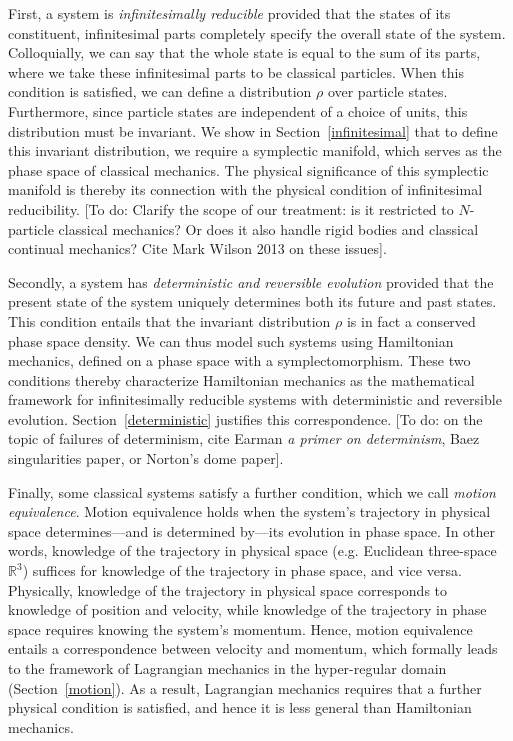 \documentclass[letterpaper]{article}
\begin{document}
First, a system is \textit{infinitesimally reducible} provided that the states of its constituent, infinitesimal parts completely specify the overall state of the system. Colloquially, we can say that the whole state is equal to the sum of its parts, where we take these infinitesimal parts to be classical particles. When this condition is satisfied, we can define a distribution $\rho$ over particle states. Furthermore, since particle states are independent of a choice of units, this distribution must be invariant. We show in Section~\ref{infinitesimal} that to define this invariant distribution, we require a symplectic manifold, which serves as the phase space of classical mechanics. The physical significance of this symplectic manifold is thereby its connection with the physical condition of infinitesimal reducibility. [To do: Clarify the scope of our treatment: is it restricted to $N$-particle classical mechanics? Or does it also handle rigid bodies and classical continual mechanics? Cite Mark Wilson 2013 on these issues]. 

Secondly, a system has \textit{deterministic and reversible evolution} provided that the present state of the system uniquely determines both its future and past states. This condition entails that the invariant distribution $\rho$ is in fact a conserved phase space density. We can thus model such systems using Hamiltonian mechanics, defined on a phase space with a symplectomorphism. These two conditions thereby characterize Hamiltonian mechanics as the mathematical framework for infinitesimally reducible systems with deterministic and reversible evolution. Section~\ref{deterministic} justifies this correspondence. [To do: on the topic of failures of determinism, cite Earman  \textit{a primer on determinism}, Baez singularities paper, or Norton's dome paper]. 

Finally, some classical systems satisfy a further condition, which we call \textit{motion equivalence}. Motion equivalence holds when the system's trajectory in physical space determines---and is determined by---its evolution in phase space. In other words, knowledge of the trajectory in physical space (e.g. Euclidean three-space $\mathbb{R}^3$) suffices for knowledge of the trajectory in phase space, and vice versa. Physically, knowledge of the trajectory in physical space corresponds to knowledge of position and velocity, while knowledge of the trajectory in phase space requires knowing the system's momentum. Hence, motion equivalence entails a correspondence between velocity and momentum, which formally leads to the framework of Lagrangian mechanics in the hyper-regular domain (Section~\ref{motion}). As a result, Lagrangian mechanics requires that a further physical condition is satisfied, and hence it is less general than Hamiltonian mechanics. 
\end{document}
